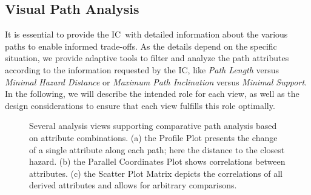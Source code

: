 \documentclass[conference,10pt,letter]{IEEEtran}
\def\IC{IC}
\begin{document}
\subsection{Visual Path Analysis} \label{sec:overview:pathanalysis}
It is essential to provide the \IC\ with detailed information about the various paths to enable informed trade-offs. As the details depend on the specific situation, we provide adaptive tools to filter and analyze the path attributes according to the information requested by the \IC , like \emph{Path Length} versus \emph{Minimal Hazard Distance} or \emph{Maximum Path Inclination} versus \emph{Minimal Support}. In the following, we will describe the intended role for each view, as well as the design considerations to ensure that each view fulfills this role optimally.

\begin{figure}
	\centering
	\hfill
	\caption{Several analysis views supporting comparative path analysis based on attribute combinations. (a) the Profile Plot presents the change of a single attribute along each path; here the distance to the closest hazard. (b) the Parallel Coordinates Plot shows correlations between attributes. (c) the Scatter Plot Matrix depicts the correlations of all derived attributes and allows for arbitrary comparisons.}
\end{figure}
\end{document}
